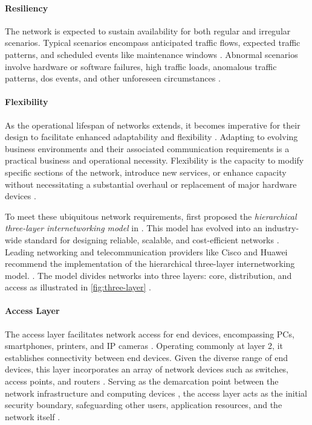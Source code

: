 \paragraph{Resiliency} %
\label{par:Resiliency}
The network is expected to sustain availability for both
    regular and irregular scenarios.
Typical scenarios encompass anticipated traffic flows, expected traffic
    patterns, and scheduled events like maintenance windows
    \cite{cisco_net_size}.
Abnormal scenarios involve hardware or software failures, high traffic loads,
    anomalous traffic patterns, \gls{dos} events, and other unforeseen
    circumstances \cite{cisco_campus_net}.

\paragraph{Flexibility} %
\label{par:Flexibility}
As the operational lifespan of networks extends, it becomes imperative for
    their design to facilitate enhanced adaptability and flexibility
    \cite{cisco_campus_net}.
Adapting to evolving business environments and their associated communication
    requirements is a practical business and operational necessity.
Flexibility is the capacity to modify specific sections of the network,
    introduce new services, or enhance capacity without necessitating a
    substantial overhaul or replacement of major hardware devices
    \cite{cisco_net_size}.

To meet these ubiquitous network requirements, \citeauthor{cisco_3_tier}
    \cite{cisco_3_tier} first proposed the \textit{hierarchical three-layer
    internetworking model} in \citeyear{cisco_3_tier}.
This model has evolved into an industry-wide standard for designing reliable,
    scalable, and cost-efficient networks \cite{cisco_net_size}.
Leading networking and telecommunication providers like Cisco and Huawei
    recommend the implementation of the hierarchical three-layer
    internetworking model.
    \cite{cisco_campus_net,huawei_campus_net}.
The model divides networks into three layers: core, distribution, and access
    as illustrated in \autoref{fig:three-layer} \cite{cisco_3_tier}.

\paragraph{Access Layer} %
\label{par:Access Layer}
The access layer facilitates network access for end devices, encompassing PCs,
    smartphones, printers, and IP cameras \cite{cisco_net_size}.
Operating commonly at layer 2, it establishes connectivity between end devices.
Given the diverse range of end devices, this layer incorporates an array of
    network devices such as switches, access points, and routers
    \cite{cisco_campus_net}.
Serving as the demarcation point between the network infrastructure and
    computing devices \cite{cisco_campus_net}, the access layer acts as the
    initial security boundary, safeguarding other users, application resources,
    and the network itself \cite{cisco_design_guide}.

